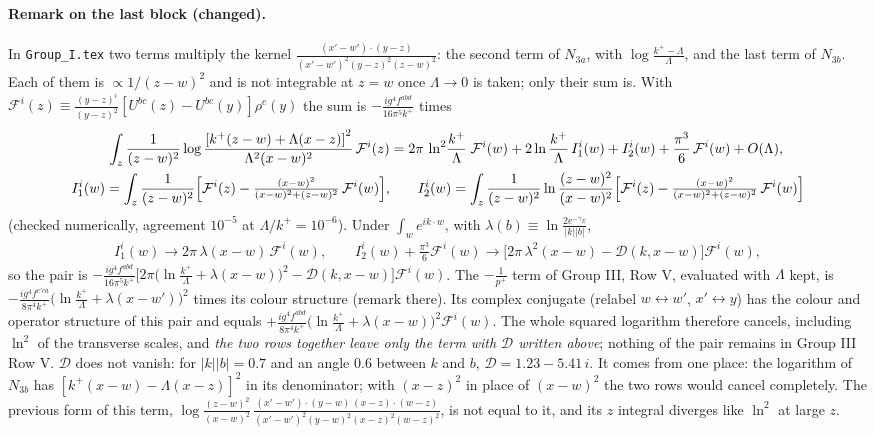\documentclass[9pt]{article}
\numberwithin{equation}{section}
\begin{document}
{\color{red}
\paragraph{Remark on the last block (changed).}
In \texttt{Group\_I.tex} two terms multiply the kernel $\frac{(x'-w')\cdot(y-z)}{(x'-w')^{2}(y-z)^{2}(z-w)^{2}}$: the second term of $N_{3a}$, with $\log\frac{k^{+}-\Lambda}{\Lambda}$, and the last term of $N_{3b}$. Each of them is $\propto 1/(z-w)^{2}$ and is not integrable at $z=w$ once $\Lambda\to0$ is taken; only their sum is. With $\mathcal{F}^{i}(z)\equiv\frac{(y-z)^{i}}{(y-z)^{2}}\left[U^{bc}(z)-U^{bc}(y)\right]\rho^{c}(y)$ the sum is $-\frac{ig^{4}f^{abd}}{16\pi^{5}k^{+}}$ times
\begin{align}
\int_{z}\frac{1}{(z-w)^{2}}\log\frac{\left[k^{+}(z-w)+\Lambda(x-z)\right]^{2}}{\Lambda^{2}(x-w)^{2}}\,\mathcal{F}^{i}(z)
&=2\pi\,\ln^{2}\!\frac{k^{+}}{\Lambda}\;\mathcal{F}^{i}(w)
+2\ln\frac{k^{+}}{\Lambda}\,I_{1}^{i}(w)+I_{2}^{i}(w)+\frac{\pi^{3}}{6}\,\mathcal{F}^{i}(w)+O(\Lambda),\\
I_{1}^{i}(w)=\int_{z}\frac{1}{(z-w)^{2}}\Big[\mathcal{F}^{i}(z)-\tfrac{(x-w)^{2}}{(x-w)^{2}+(z-w)^{2}}\,\mathcal{F}^{i}(w)\Big],&\qquad
I_{2}^{i}(w)=\int_{z}\frac{1}{(z-w)^{2}}\ln\frac{(z-w)^{2}}{(x-w)^{2}}\Big[\mathcal{F}^{i}(z)-\tfrac{(x-w)^{2}}{(x-w)^{2}+(z-w)^{2}}\,\mathcal{F}^{i}(w)\Big]\notag
\end{align}
(checked numerically, agreement $10^{-5}$ at $\Lambda/k^{+}=10^{-6}$). Under $\int_{w}e^{ik\cdot w}$, with $\lambda(b)\equiv\ln\frac{2e^{-\gamma_{E}}}{|k||b|}$,
\begin{align}
I_{1}^{i}(w)\to2\pi\,\lambda(x-w)\,\mathcal{F}^{i}(w),\qquad
I_{2}^{i}(w)+\frac{\pi^{3}}{6}\mathcal{F}^{i}(w)\to\Big[2\pi\,\lambda^{2}(x-w)-\mathcal{D}(k,x-w)\Big]\mathcal{F}^{i}(w),
\end{align}
so the pair is $-\frac{ig^{4}f^{abd}}{16\pi^{5}k^{+}}\Big[2\pi\big(\ln\frac{k^{+}}{\Lambda}+\lambda(x-w)\big)^{2}-\mathcal{D}(k,x-w)\Big]\mathcal{F}^{i}(w)$. The $-\frac{1}{p^{+}}$ term of Group III, Row V, evaluated with $\Lambda$ kept, is $-\frac{ig^{4}f^{c'ca}}{8\pi^{4}k^{+}}\big(\ln\frac{k^{+}}{\Lambda}+\lambda(x-w')\big)^{2}$ times its colour structure (remark there). Its complex conjugate (relabel $w\leftrightarrow w'$, $x'\leftrightarrow y$) has the colour and operator structure of this pair and equals $+\frac{ig^{4}f^{abd}}{8\pi^{4}k^{+}}\big(\ln\frac{k^{+}}{\Lambda}+\lambda(x-w)\big)^{2}\mathcal{F}^{i}(w)$. The whole squared logarithm therefore cancels, including $\ln^{2}$ of the transverse scales, and \emph{the two rows together leave only the term with $\mathcal{D}$ written above}; nothing of the pair remains in Group III Row V. $\mathcal{D}$ does not vanish: for $|k||b|=0.7$ and an angle $0.6$ between $k$ and $b$, $\mathcal{D}=1.23-5.41\,i$. It comes from one place: the logarithm of $N_{3b}$ has $[k^{+}(x-w)-\Lambda(x-z)]^{2}$ in its denominator; with $(x-z)^{2}$ in place of $(x-w)^{2}$ the two rows would cancel completely. The previous form of this term, $\log\frac{(z-w)^{2}}{(x-w)^{2}}\,\frac{(x'-w')\cdot(y-w)\,(x-z)\cdot(w-z)}{(x'-w')^{2}(y-w)^{2}(x-z)^{2}(w-z)^{2}}$, is not equal to it, and its $z$ integral diverges like $\ln^{2}$ at large $z$.
}
\end{document}
